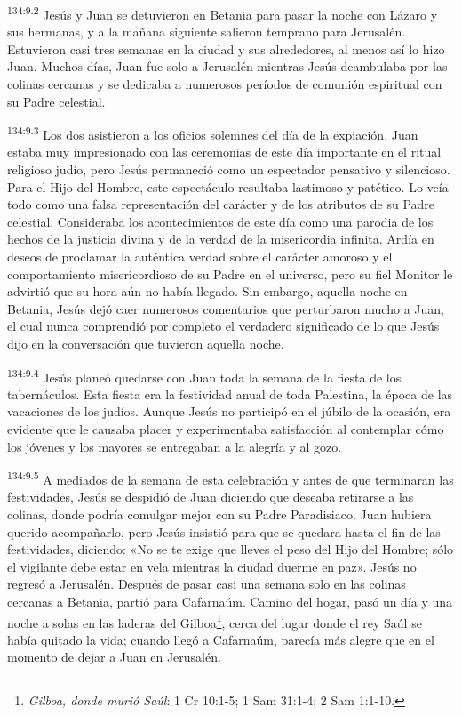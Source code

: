 \par 
\textsuperscript{134:9.2} Jesús y Juan se detuvieron en Betania para pasar la noche con Lázaro y sus hermanas, y a la mañana siguiente salieron temprano para Jerusalén. Estuvieron casi tres semanas en la ciudad y sus alrededores, al menos así lo hizo Juan. Muchos días, Juan fue solo a Jerusalén mientras Jesús deambulaba por las colinas cercanas y se dedicaba a numerosos períodos de comunión espiritual con su Padre celestial.

\par 
\textsuperscript{134:9.3} Los dos asistieron a los oficios solemnes del día de la expiación. Juan estaba muy impresionado con las ceremonias de este día importante en el ritual religioso judío, pero Jesús permaneció como un espectador pensativo y silencioso. Para el Hijo del Hombre, este espectáculo resultaba lastimoso y patético. Lo veía todo como una falsa representación del carácter y de los atributos de su Padre celestial. Consideraba los acontecimientos de este día como una parodia de los hechos de la justicia divina y de la verdad de la misericordia infinita. Ardía en deseos de proclamar la auténtica verdad sobre el carácter amoroso y el comportamiento misericordioso de su Padre en el universo, pero su fiel Monitor le advirtió que su hora aún no había llegado. Sin embargo, aquella noche en Betania, Jesús dejó caer numerosos comentarios que perturbaron mucho a Juan, el cual nunca comprendió por completo el verdadero significado de lo que Jesús dijo en la conversación que tuvieron aquella noche.

\par 
\textsuperscript{134:9.4} Jesús planeó quedarse con Juan toda la semana de la fiesta de los tabernáculos. Esta fiesta era la festividad anual de toda Palestina, la época de las vacaciones de los judíos. Aunque Jesús no participó en el júbilo de la ocasión, era evidente que le causaba placer y experimentaba satisfacción al contemplar cómo los jóvenes y los mayores se entregaban a la alegría y al gozo.

\par 
\textsuperscript{134:9.5} A mediados de la semana de esta celebración y antes de que terminaran las festividades, Jesús se despidió de Juan diciendo que deseaba retirarse a las colinas, donde podría comulgar mejor con su Padre Paradisiaco. Juan hubiera querido acompañarlo, pero Jesús insistió para que se quedara hasta el fin de las festividades, diciendo: «No se te exige que lleves el peso del Hijo del Hombre; sólo el vigilante debe estar en vela mientras la ciudad duerme en paz». Jesús no regresó a Jerusalén. Después de pasar casi una semana solo en las colinas cercanas a Betania, partió para Cafarnaúm. Camino del hogar, pasó un día y una noche a solas en las laderas del Gilboa\footnote{\textit{Gilboa, donde murió Saúl}: 1 Cr 10:1-5; 1 Sam 31:1-4; 2 Sam 1:1-10.}, cerca del lugar donde el rey Saúl se había quitado la vida; cuando llegó a Cafarnaúm, parecía más alegre que en el momento de dejar a Juan en Jerusalén.


